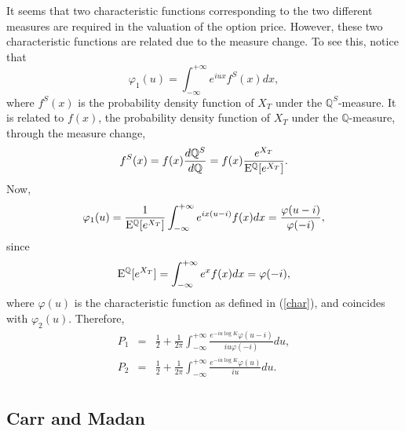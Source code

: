 \documentclass[12pt]{article}
\begin{document}
    It seems that two characteristic functions corresponding to the two different measures are required in the valuation of the option
    price. However, these two characteristic functions are related due to the measure change. To see this, notice that
    \begin{equation}
      \varphi_1(u)=\int_{-\infty}^{+\infty}e^{iux}f^S(x)dx,
    \end{equation}
    where $f^S(x)$ is the probability density function of $X_T$ under the $\mathbb{Q}^S$-measure. It is related to $f(x)$, the probability density
    function of $X_T$ under the $\mathbb{Q}$-measure, through the measure change,
    \begin{equation}
      f^S(x)=f(x)\frac{d{\mathbb{Q}}^S}{d{\mathbb{Q}}}=f(x)\frac{e^{X_T}}{{\rm E}^{\mathbb{Q}}[e^{X_T}]}.
    \end{equation}
    Now,
    \begin{equation}
      \varphi_1(u)=\frac{1}{{\rm E}^{\mathbb{Q}}[e^{X_T}]}\int_{-\infty}^{+\infty}e^{ix(u-i)}f(x)dx=\frac{\varphi(u-i)}{\varphi(-i)},
    \end{equation}
    since
    \begin{equation}
      {\rm E}^{\mathbb{Q}}[e^{X_T}]=\int_{-\infty}^{+\infty}e^{x}f(x)dx=\varphi(-i),
    \end{equation}
    where $\varphi(u)$ is the characteristic function as defined in (\ref{char}), and coincides with $\varphi_2(u)$. Therefore,
    \begin{eqnarray}
      P_1 &=& \frac{1}{2}+\frac{1}{2\pi}\int_{-\infty}^{+\infty}\frac{e^{-iu\log K}\varphi(u-i)}{iu\varphi(-i)}du, \\
      P_2 &=& \frac{1}{2}+\frac{1}{2\pi}\int_{-\infty}^{+\infty}\frac{e^{-iu\log K}\varphi(u)}{iu}du. \\
    \end{eqnarray}

  \subsection{Carr and Madan \cite{CarrMadan}}
\end{document}
